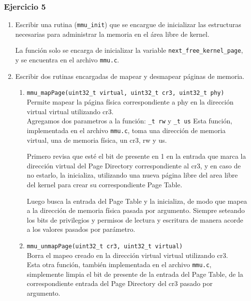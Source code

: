 \documentclass[a4paper]{article}
\begin{document}
 \subsubsection{Ejercicio 5}
 
 \begin{enumerate}[label=\alph*)]
 	\item Escribir una rutina (\texttt{mmu\_init}) que se encargue de inicializar las estructuras necesarias para administrar la memoria en el área libre de kernel.
 	
 	La función solo se encarga de inicializar la variable \texttt{next\_free\_kernel\_page},
 	y se encuentra en el archivo \texttt{mmu.c}.
 	
 		\item Escribir dos rutinas encargadas de mapear y desmapear páginas de memoria.
 	\begin{enumerate}[label=\Roman{*}-]
 		\item \texttt{mmu\_mapPage(uint32\_t virtual, uint32\_t cr3, uint32\_t phy)}\\
 		Permite mapear la página f\'isica correspondiente a phy en la dirección virtual virtual	utilizando cr3.\\
 		
 		Agregamos dos parametros a la funci\'on: \texttt{\_t rw} y \texttt{\_t us}
 		Esta función, implementada en el archivo \texttt{mmu.c}, toma una dirección de memoria virtual,
 		una de memoria f\'isica, un cr3, rw y us. 
 		
 		Primero revisa que esté el bit de presente en 1 en la
 		entrada que marca la dirección virtual del Page Directory correspondiente al cr3, y en 
 		caso de no estarlo, la inicializa, utilizando una nueva página libre del area libre del kernel para crear
 		su correspondiente Page Table. 
 		
 		Luego busca la entrada del Page Table  y la	inicializa, de modo que mapea a la dirección de memoria f\'isica pasada por argumento. Siempre seteando los bits de privilegios y permisos de lectura y escritura de manera acorde a los valores pasados por par\'ametro.\\
 		
 		\item \texttt{mmu\_unmapPage(uint32\_t cr3, uint32\_t virtual)} \\
 		Borra el mapeo creado en la dirección virtual virtual utilizando cr3.\\
 		
 		Esta otra función, también implementada en el archivo \texttt{mmu.c}, simplemente limpia el bit de presente de la entrada del Page Table, de la correspondiente entrada del Page Directory del cr3 pasado por argumento.
 		

\end{enumerate}
\end{enumerate}
\end{document}
